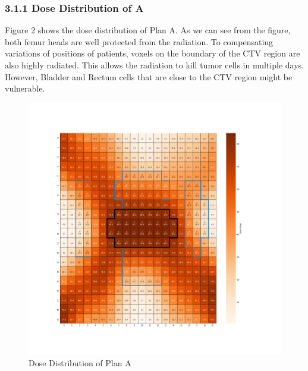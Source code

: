 \documentclass{report}
\begin{document}
\subsubsection{3.1.1 Dose Distribution of A}
Figure 2 shows the dose distribution of Plan A. As we can see from the figure, both femur heads are well protected from the radiation. To compensating variations of positions of patients, voxels on the boundary of the CTV region are also highly radiated. This allows the radiation to kill tumor cells in multiple days. However, Bladder and Rectum cells that are close to the CTV region might be vulnerable. 
\begin{figure}[H]
    \centering
    \includegraphics[width=0.95\columnwidth]{a-dose.png}
    \caption{Dose Distribution of Plan A}
    
\end{figure}
\end{document}
